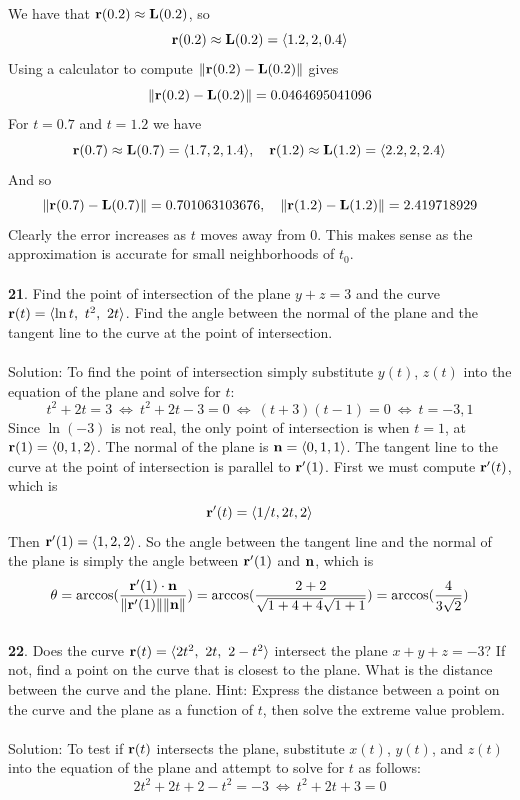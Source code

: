 \documentclass[12pt]{amsbook}
\newcommand{\la}{\langle}
\newcommand{\ra}{\rangle}
\begin{document}
We have that ${\bf r}(0.2)\approx{\bf L}(0.2)$, so
$${\bf r}(0.2)\approx{\bf L}(0.2)=\la 1.2, 2,0.4 \ra$$
Using a calculator to compute $\|{\bf r}(0.2)-{\bf L}(0.2)\|$ gives
$$\|{\bf r}(0.2)-{\bf L}(0.2)\|=0.0464695041096$$
For $t=0.7$ and $t=1.2$ we have
$${\bf r}(0.7)\approx{\bf L}(0.7)=\la 1.7, 2,1.4 \ra, \ \ \ {\bf r}(1.2)\approx{\bf L}(1.2)=\la 2.2, 2,2.4 \ra$$
And so
$$\|{\bf r}(0.7)-{\bf L}(0.7)\|=0.701063103676, \ \ \ \|{\bf r}(1.2)-{\bf L}(1.2)\|=2.419718929$$
Clearly the error increases as $t$ moves away from $0$. This makes sense as the approximation is accurate for small neighborhoods of $t_0$. 
\\
\\
{\small\bf 21}. Find the point of intersection of the plane $y + z = 3$ and the curve ${\bf r}(t)=\la \ln t, \ t^2, \ 2t \ra$. Find the angle between the normal of the plane and the tangent line to the curve at the point of intersection.
\\
\\
{\sc Solution}: To find the point of intersection simply substitute $y(t)$, $z(t)$ into the equation of the plane and solve for $t$:
$$t^2+2t=3 \ \Leftrightarrow \ t^2+2t-3=0 \ \Leftrightarrow \ (t+3)(t-1)=0 \ \Leftrightarrow \ t=-3,1$$
Since $\ln(-3)$ is not real, the only point of intersection is when $t=1$, at ${\bf r}(1)=\la 0,1,2 \ra$. The normal of the plane is ${\bf n}=\la 0,1,1 \ra$. The tangent line to the curve at the point of intersection is parallel to ${\bf r}'(1)$. First we must compute ${\bf r}'(t)$, which is
$${\bf r}'(t)=\la 1/t, 2t, 2 \ra$$
Then ${\bf r}'(1)=\la 1,2,2 \ra$. So the angle between the tangent line and the normal of the plane is simply the angle between ${\bf r}'(1)$ and ${\bf n}$, which is
$$\theta=\arccos(\frac{{\bf r}'(1)\cdot{\bf n}}{\|{\bf r}'(1)\|\|{\bf n}\|})=\arccos(\frac{2+2}{\sqrt{1+4+4}\sqrt{1+1}})=\arccos(\frac{4}{3\sqrt{2}})$$
\\
{\small\bf 22}. Does the curve ${\bf r}(t)=\la 2t^2, \ 2t, \ 2-t^2 \ra$ intersect the plane $x+y+z = -3$?
If not, find a point on the curve that is closest to the plane. What is the
distance between the curve and the plane. Hint: Express the distance between
a point on the curve and the plane as a function of $t$, then solve the extreme value problem.
\\
\\
{\sc Solution}: To test if ${\bf r}(t)$ intersects the plane, substitute $x(t)$, $y(t)$, and $z(t)$ into the equation of the plane and attempt to solve for $t$ as follows:
$$2t^2+2t+2-t^2=-3 \ \Leftrightarrow \ t^2+2t+3=0$$
\end{document}
